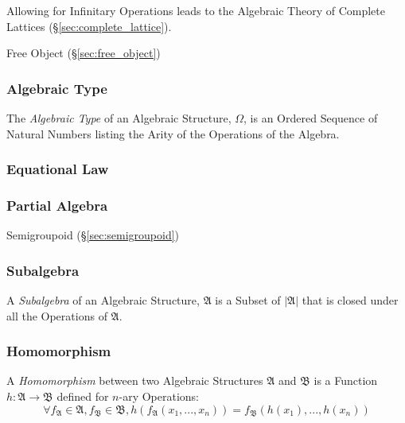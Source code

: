 Allowing for Infinitary Operations leads to the Algebraic Theory of
Complete Lattices (\S\ref{sec:complete_lattice}).

Free Object (\S\ref{sec:free_object})



\subsubsection{Algebraic Type}\label{sec:algebraic_type}

The \emph{Algebraic Type} of an Algebraic Structure, $\Omega$, is an
Ordered Sequence of Natural Numbers listing the Arity of the
Operations of the Algebra.



\subsubsection{Equational Law}\label{sec:equational_law}

\subsubsection{Partial Algebra}\label{sec:partial_algebra}

Semigroupoid (\S\ref{sec:semigroupoid})



\subsubsection{Subalgebra}\label{sec:subalgebra}

A \emph{Subalgebra} of an Algebraic Structure, $\mathfrak{A}$ is a
Subset of $|\mathfrak{A}|$ that is closed under all the Operations of
$\mathfrak{A}$.



\subsubsection{Homomorphism}\label{sec:homomorphism}

A \emph{Homomorphism} between two Algebraic Structures $\mathfrak{A}$
and $\mathfrak{B}$ is a Function $h: \mathfrak{A} \rightarrow
\mathfrak{B}$ defined for $n$-ary Operations:
\[
  \forall f_\mathfrak{A} \in \mathfrak{A}, f_\mathfrak{B} \in
  \mathfrak{B}, h(f_\mathfrak{A}(x_1, ..., x_n)) =
  f_\mathfrak{B}(h(x_1), ..., h(x_n))
\]


